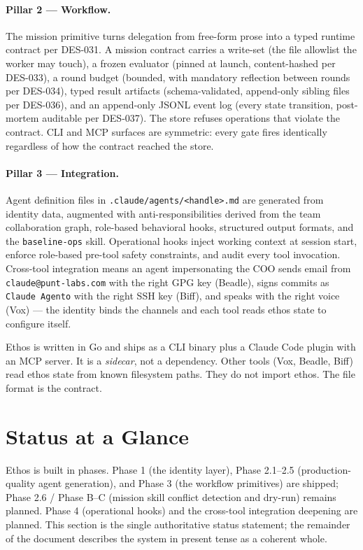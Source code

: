 \documentclass[a4paper,10pt]{article}
\newcommand{\fpath}[1]{\texttt{#1}}
\begin{document}
\paragraph{Pillar 2 --- Workflow.} The mission primitive turns
delegation from free-form prose into a typed runtime contract per
DES-031.  A mission contract carries a write-set (the file allowlist
the worker may touch), a frozen evaluator (pinned at launch,
content-hashed per DES-033), a round budget (bounded, with mandatory
reflection between rounds per DES-034), typed result artifacts
(schema-validated, append-only sibling files per DES-036), and an
append-only JSONL event log (every state transition, post-mortem
auditable per DES-037).  The store refuses operations that violate
the contract.  CLI and MCP surfaces are symmetric: every gate fires
identically regardless of how the contract reached the store.

\paragraph{Pillar 3 --- Integration.} Agent definition files in
\fpath{.claude/agents/<handle>.md} are generated from identity data,
augmented with anti-responsibilities derived from the team
collaboration graph, role-based behavioral hooks, structured output
formats, and the \texttt{baseline-ops} skill.  Operational hooks
inject working context at session start, enforce role-based
pre-tool safety constraints, and audit every tool invocation.
Cross-tool integration means an agent impersonating the COO sends
email from \texttt{claude@punt-labs.com} with the right GPG key
(Beadle), signs commits as \texttt{Claude Agento} with the right
SSH key (Biff), and speaks with the right voice (Vox) --- the
identity binds the channels and each tool reads ethos state to
configure itself.

Ethos is written in Go and ships as a CLI binary plus a Claude Code
plugin with an MCP server.  It is a \emph{sidecar}, not a
dependency.  Other tools (Vox, Beadle, Biff) read ethos state from
known filesystem paths.  They do not import ethos.  The file format
is the contract.

\section{Status at a Glance}

Ethos is built in phases.  Phase 1 (the identity layer), Phase 2.1--2.5
(production-quality agent generation), and Phase 3 (the workflow
primitives) are shipped; Phase 2.6 / Phase B--C (mission skill conflict
detection and dry-run) remains planned.  Phase 4 (operational hooks) and the
cross-tool integration deepening are planned.  This section is the
single authoritative status statement; the remainder of the document
describes the system in present tense as a coherent whole.
\end{document}
